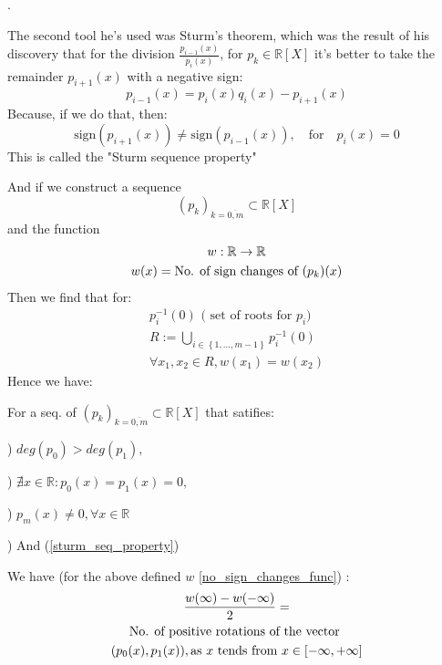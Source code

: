 .

The second tool he's used was Sturm's theorem, which was the result
of his discovery that for the division $\frac{p_{i-1}(x)}{p_i(x)}$,
for $p_k \in \mathbb{R}[X]$ it's better to take the remainder
$p_{i+1}(x)$ with a negative sign:
\begin{equation}\label{euclid_algorithm}
p_{i-1}(x) = p_i(x) q_i(x) - p_{i+1}(x) \tag{Euclid's Algorithm}
\end{equation}
Because, if we do that, then:
\begin{equation}\label{sturm_seq_property}
\text{sign} ( p_{i+1}(x) )  \neq \text{sign} ( p_{i-1}(x) ), \quad
\text{for} \quad p_i(x)=0 \tag{Sturm. Seq. Property}
\end{equation}
This is called the "Sturm sequence property"

And if we construct a sequence
\[
(p_k)_{k = \overline{0,m}} \subset \mathbb{R}[X]
\]
and the function
\begin{gather}\label{no_sign_changes_func}
w : \mathbb{R} \rightarrow \mathbb{R} \notag  \\
w(x) = \text{No. of sign changes of  } (p_k)(x) \notag
\end{gather}
Then we find that for:
\begin{gather*}
p_i^{-1}(0) \text{ ( set of roots for $p_i$) } \\
R := \bigcup_{i \in \left\{ 1, \dots, m-1 \right\} } p_i^{-1}(0) \\
\forall x_1, x_2 \in R, w(x_1) = w(x_2)
\end{gather*}
Hence we have:
\begin{lemma}\label{sturm_lemma}
For a seq. of $  (p_k)_{k = \overline{0,m}} \subset \mathbb{R}[X]$
that satifies:

)
$ deg(p_0) > deg(p_1), $

)
$\nexists x \in \mathbb{R} : p_0(x) = p_1(x) = 0, $

)
$p_m(x) \neq 0, \forall x \in \mathbb{R}$

)
And (\ref{sturm_seq_property})
\par
We have (for the above defined $w$ \ref{no_sign_changes_func}) :
\begin{gather}
\frac{w(\infty) - w(-\infty)}{2} =  \notag \\
\text{No. of positive rotations of the vector } \notag \\
(p_0(x), p_1(x)), \text{as $x$ tends from  } x \in [-\infty, +\infty] \notag
\end{gather}
\end{lemma}

